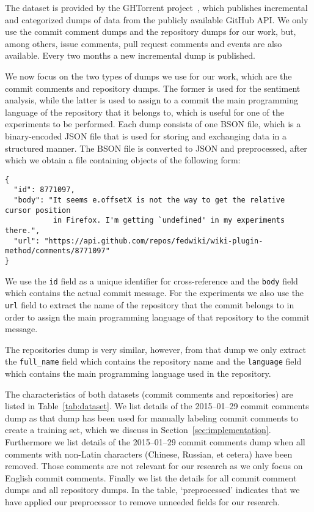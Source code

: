 \documentclass{article}
\begin{document}
The dataset is provided by the GHTorrent project~\cite{ghtorrent}, which
publishes incremental and categorized dumps of data from the publicly
available GitHub API\@. We only use the commit comment dumps and the
repository dumps for our work, but, among others, issue comments, pull
request comments and events are also available. Every two months a new
incremental dump is published.

We now focus on the two types of dumps we use for our work, which are the
commit comments and repository dumps. The former is used for the sentiment
analysis, while the latter is used to assign to a commit the main programming
language of the repository that it belongs to, which is useful for one of
the experiments to be performed. Each dump consists of one BSON file, which
is a binary-encoded JSON file that is used for storing and exchanging data
in a structured manner. The BSON file is converted to JSON and preprocessed,
after which we obtain a file containing objects of the following form:

\begin{verbatim}
{
  "id": 8771097,
  "body": "It seems e.offsetX is not the way to get the relative cursor position
           in Firefox. I'm getting `undefined' in my experiments there.",
  "url": "https://api.github.com/repos/fedwiki/wiki-plugin-method/comments/8771097"
}
\end{verbatim}

We use the {\tt id} field as a unique identifier for cross-reference and
the {\tt body} field which contains the actual commit message. For the
experiments we also use the {\tt url} field to extract the name of the
repository that the commit belongs to in order to assign the main
programming language of that repository to the commit message.

The repositories dump is very similar, however, from that dump we only
extract the {\tt full\_name} field which contains the repository name and
the {\tt language} field which contains the main programming language used
in the repository.

The characteristics of both datasets (commit comments and repositories) are
listed in Table~\ref{tab:dataset}. We list details of the 2015--01--29
commit comments dump as that dump has been used for manually labeling commit
comments to create a training set, which we discuss in
Section~\ref{sec:implementation}. Furthermore we list details of the
2015--01--29 commit comments dump when all comments with non-Latin characters
(Chinese, Russian, et cetera) have been removed. Those comments are not
relevant for our research as we only focus on English commit comments. Finally
we list the details for all commit comment dumps and all repository dumps. In
the table, `preprocessed' indicates that we have applied our preprocessor to
remove unneeded fields for our research.
\end{document}
